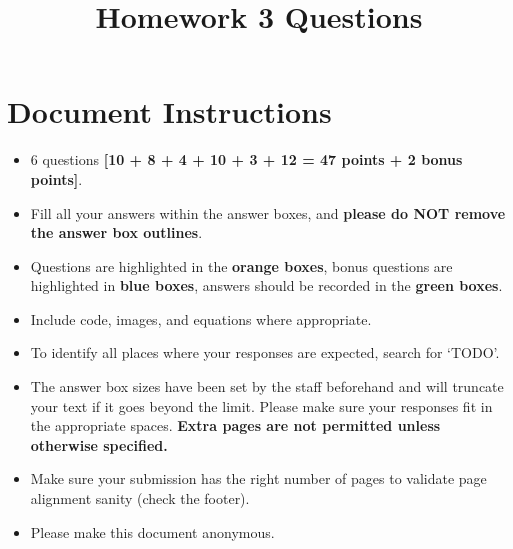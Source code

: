 
\date{}

\title{\vspace{-1cm}Homework 3 Questions}



\maketitle
\vspace{-2cm}
\thispagestyle{fancy}

\section*{ Document Instructions}
\begin{itemize}
  \item 6 questions \textbf{[10 + 8 + 4 + 10 + 3 + 12 = 47 points + 2 bonus points]}.
  \item Fill all your answers within the answer boxes, and \textbf{please do NOT remove the answer box outlines}.
  \item Questions are highlighted in the \textbf{orange boxes}, bonus questions are highlighted in \textbf{blue boxes}, answers should be recorded in the \textbf{green boxes}.
  \item Include code, images, and equations where appropriate.
  \item To identify all places where your responses are expected, search for `TODO'.
  \item The answer box sizes have been set by the staff beforehand and will truncate your text if it goes beyond the limit. Please make sure your responses fit in the appropriate spaces. \textbf{Extra pages are not permitted unless otherwise specified.}
  \item Make sure your submission has the right number of pages to validate page alignment sanity (check the footer).
  \item Please make this document anonymous.
\end{itemize}

